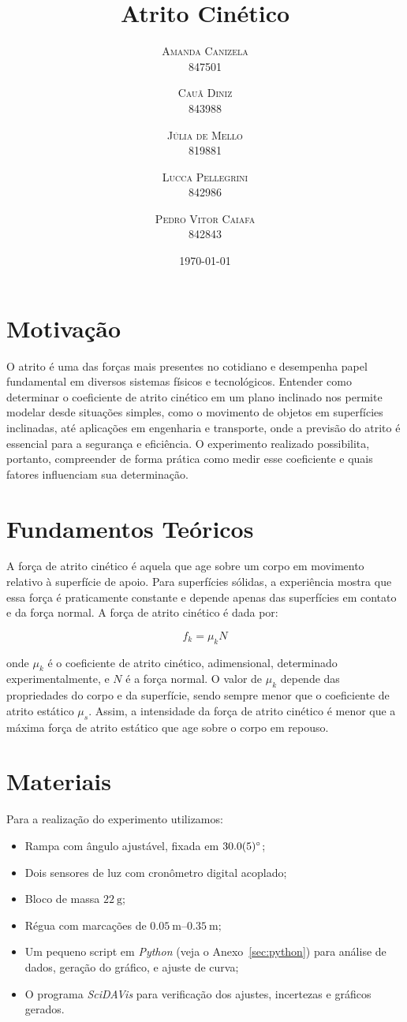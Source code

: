 \documentclass[10pt,oneside,twocolumn,a4paper]{article}
\title{Atrito Cinético}
\author{
	\textsc{Amanda Canizela} \\[1ex]
	\normalsize{847501}
	\and \textsc{Cauã Diniz} \\[1ex]
	\normalsize{843988}
	\and \textsc{Júlia de Mello} \\[1ex]
	\normalsize{819881}
	\and \textsc{Lucca Pellegrini} \\[1ex]
	\normalsize{842986}
	\and \textsc{Pedro Vitor Caiafa} \\[1ex]
	\normalsize{842843}
}
\date{\today}
\begin{document}
\maketitle

\section{Motivação}

O atrito é uma das forças mais presentes no cotidiano e desempenha papel
fundamental em diversos sistemas físicos e tecnológicos. Entender como
determinar o coeficiente de atrito cinético em um plano inclinado nos permite
modelar desde situações simples, como o movimento de objetos em superfícies
inclinadas, até aplicações em engenharia e transporte, onde a previsão do
atrito é essencial para a segurança e eficiência. O experimento realizado
possibilita, portanto, compreender de forma prática como medir esse coeficiente
e quais fatores influenciam sua determinação.

\section{Fundamentos Teóricos}

A força de atrito cinético é aquela que age sobre um corpo em movimento
relativo à superfície de apoio. Para superfícies sólidas, a experiência mostra
que essa força é praticamente constante e depende apenas das superfícies em
contato e da força normal. A força de atrito cinético é dada por:

\begin{equation*}
f_k = \mu_k N
\end{equation*}

onde $\mu_k$ é o coeficiente de atrito cinético, adimensional, determinado
experimentalmente, e $N$ é a força normal. O valor de $\mu_k$ depende das
propriedades do corpo e da superfície, sendo sempre menor que o coeficiente de
atrito estático $\mu_s$. Assim, a intensidade da força de atrito cinético é
menor que a máxima força de atrito estático que age sobre o corpo em repouso.

\section{Materiais}

Para a realização do experimento utilizamos:

\begin{itemize}
    \item Rampa com ângulo ajustável, fixada em $\SI{30 \pm 0.5}{\degree}$;
    \item Dois sensores de luz com cronômetro digital acoplado;
    \item Bloco de massa $\SI{22}{\gram}$;
	\item Régua com marcações de $\SIrange{0.05}{0.35}{\metre};$
	\item Um pequeno script em \textit{Python} (veja o Anexo~\ref{sec:python})
		para análise de dados, geração do gráfico, e ajuste de curva;
	\item O programa \textit{SciDAVis} para verificação dos ajustes, incertezas
		e gráficos gerados.
\end{itemize}
\end{document}
